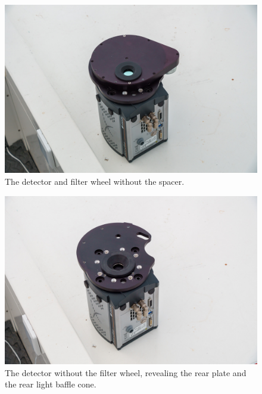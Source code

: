 \begin{figure}
\begin{center}
\includegraphics[width=0.8\linewidth]{figures/huitzi-without-spacer.jpg}
\end{center}
\caption{The detector and filter wheel without the spacer.}
\label{figure:huitzi-without-spacer}
\end{figure}

\begin{figure}
\begin{center}
\includegraphics[width=0.8\linewidth]{figures/huitzi-without-filter-wheel.jpg}
\end{center}
\caption{The detector without the filter wheel, revealing the rear plate and the rear light baffle cone.} 
\label{figure:huitzi-without-filter-wheel}
\end{figure}

